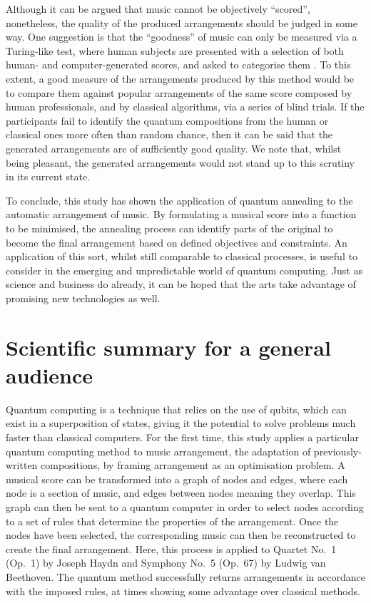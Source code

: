 \documentclass[12pt]{article}
\theoremstyle{definition}
\begin{document}
Although it can be argued that music cannot be objectively ``scored'', nonetheless, the quality of the produced arrangements should be judged in some way. One suggestion is that the ``goodness'' of music can only be measured via a Turing-like test, where human subjects are presented with a selection of both human- and computer-generated scores, and asked to categorise them \cite{pearce_towards_2001}. To this extent, a good measure of the arrangements produced by this method would be to compare them against popular arrangements of the same score composed by human professionals, and by classical algorithms, via a series of blind trials. If the participants fail to identify the quantum compositions from the human or classical ones more often than random chance, then it can be said that the generated arrangements are of sufficiently good quality. We note that, whilst being pleasant, the generated arrangements would not stand up to this scrutiny in its current state.

To conclude, this study has shown the application of quantum annealing to the automatic arrangement of music. By formulating a musical score into a function to be minimised, the annealing process can identify parts of the original to become the final arrangement based on defined objectives and constraints. An application of this sort, whilst still comparable to classical processes, is useful to consider in the emerging and unpredictable world of quantum computing. Just as science and business do already, it can be hoped that the arts take advantage of promising new technologies as well.

\begin{singlespace*}
    \printbibliography[heading=bibintoc,block=space]
\end{singlespace*}

\clearpage
\section*{Scientific summary for a general audience} %

Quantum computing is a technique that relies on the use of qubits, which can exist in a superposition of states, giving it the potential to solve problems much faster than classical computers. For the first time, this study applies a particular quantum computing method to music arrangement, the adaptation of previously-written compositions, by framing arrangement as an optimisation problem. A musical score can be transformed into a graph of nodes and edges, where each node is a section of music, and edges between nodes meaning they overlap. This graph can then be sent to a quantum computer in order to select nodes according to a set of rules that determine the properties of the arrangement. Once the nodes have been selected, the corresponding music can then be reconstructed to create the final arrangement. Here, this process is applied to Quartet No.\ 1 (Op.\ 1) by Joseph Haydn and Symphony No.\ 5 (Op.\ 67) by Ludwig van Beethoven. The quantum method successfully returns arrangements in accordance with the imposed rules, at times showing some advantage over classical methods.
\end{document}
